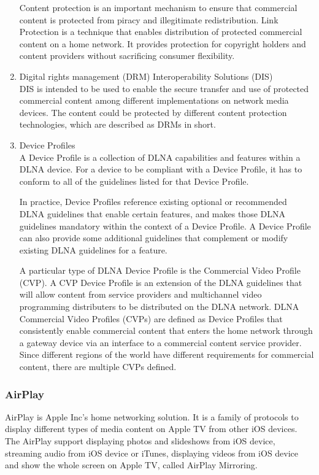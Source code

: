 \begin{enumerate}
Content protection is an important mechanism to ensure that commercial content is protected 
from piracy and illegitimate redistribution. Link Protection is a technique that enables 
distribution of protected commercial content on a home network. It provides protection for copyright holders and content providers without sacrificing consumer flexibility. 
\item Digital rights management (DRM) Interoperability Solutions (DIS) \\ 
DIS is intended to be used to enable the secure transfer and use of protected 
commercial content among different implementations on network media devices. 
The content could be protected by different content protection technologies, 
which are described as DRMs in short. 
\item Device Profiles \\ 
A Device Profile is a collection of DLNA capabilities and features within a DLNA device. For a device 
to be compliant with a Device Profile, it has to conform to all of the guidelines listed for that 
Device Profile. 

In practice, Device Profiles reference existing optional or recommended DLNA guidelines that enable certain features, and makes those DLNA guidelines mandatory within the context of a Device Profile. 
A Device Profile can also provide some additional guidelines that complement or modify existing DLNA guidelines for a feature. 

A particular type of DLNA Device Profile is the Commercial Video Profile (CVP). A CVP Device Profile is an extension of the DLNA guidelines that will allow content from service providers and multichannel video programming distributers to be distributed on the DLNA network. DLNA Commercial Video Profiles (CVPs) are defined as Device Profiles that consistently enable commercial content that enters the home network through a gateway device via an interface to a commercial content service provider. Since different regions of the world have different requirements for commercial content, there are multiple CVPs defined. 

\end{enumerate} 

\subsubsection{AirPlay} 
AirPlay is Apple Inc's home networking solution. It is a family of protocols 
to display different types of media content on Apple TV from other iOS devices. 
The AirPlay support displaying photos and slideshows from iOS device, streaming 
audio from iOS device or iTunes, displaying videos from iOS device and 
show the whole screen on Apple TV, called AirPlay Mirroring. 

